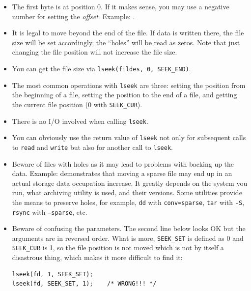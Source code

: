 \begin{itemize}
\item {} The first byte is at position 0.  If it makes sense, you may
use a negative number for setting the \emph{offset}.  Example:
.
\item It is legal to move beyond the end of the file.  If data is written there,
the file size will be set accordingly, the ``holes'' will be read as zeros.
Note that just changing the file position will not increase the file size.
\item You can get the file size via \texttt{lseek(fildes, 0, SEEK\_END)}.
\item The most common operations with \texttt{lseek} are three: setting the
position from the beginning of a file, setting the position to the end of a
file, and getting the current file position (0 with \texttt{SEEK\_CUR}).
\item There is no I/O involved when calling \texttt{lseek}.
\item You can obviously use the return value of \texttt{lseek} not only for
subsequent calls to \texttt{read} and \texttt{write} but also for another call
to \texttt{lseek}.
\item {} Beware of files with holes as it may lead to problems
with backing up the data.  Example:  demonstrates that
moving a sparse file may end up in an actual storage data occupation increase.
It greatly depends on the system you run, what archiving utility is used, and
their versions.  Some utilities provide the means to preserve holes, for example,
\texttt{dd} with \texttt{conv=sparse}, \texttt{tar} with \texttt{-S},
\texttt{rsync} with \texttt{--sparse}, etc.
\item Beware of confusing the parameters.  The second line below looks OK but
the arguments are in reversed order.  What is more, \texttt{SEEK\_SET} is
defined as 0 and \texttt{SEEK\_CUR} is 1, so the file position is not moved
which is not by itself a disastrous thing, which makes it more difficult to find
it:

\begin{verbatim}
lseek(fd, 1, SEEK_SET);
lseek(fd, SEEK_SET, 1);    /* WRONG!!! */
\end{verbatim}
\end{itemize}



